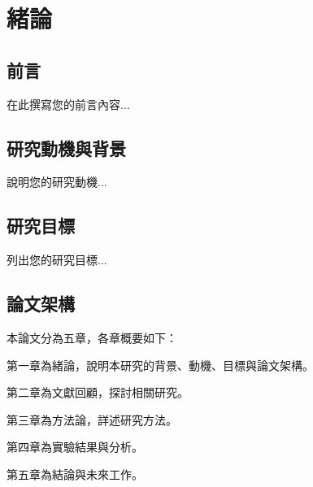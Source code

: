
\chapter{緒論}

\section{前言}

在此撰寫您的前言內容...

\section{研究動機與背景}

說明您的研究動機...

\section{研究目標}

列出您的研究目標...

\section{論文架構}

本論文分為五章，各章概要如下：

第一章為緒論，說明本研究的背景、動機、目標與論文架構。

第二章為文獻回顧，探討相關研究。

第三章為方法論，詳述研究方法。

第四章為實驗結果與分析。

第五章為結論與未來工作。
